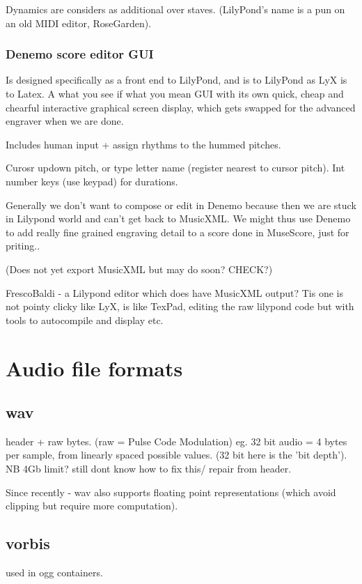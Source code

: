 \documentclass[oneside,english]{scrbook}
\begin{document}
Dynamics are considers as additional over staves.  (LilyPond's name is a pun on an old MIDI editor, RoseGarden).

\subsection{Denemo score editor GUI}
Is designed specifically as a front end to LilyPond, and is to LilyPond as LyX is to Latex.  A what you see if what you mean GUI with its own quick, cheap and chearful interactive graphical screen display, which gets swapped for the advanced engraver when we are done.

Includes human input + assign rhythms to the hummed pitches.

Curosr updown pitch, or type letter name (register nearest to cursor pitch).  Int number keys (use keypad) for durations.

Generally we don't want to compose or edit in Denemo because then we are stuck in Lilypond world and can't get back to MusicXML.  We might thus use Denemo to add really fine grained engraving detail to a score done in MuseScore, just for priting..

(Does not yet export MusicXML but may do soon? CHECK?)

FrescoBaldi - a Lilypond editor which does have MusicXML output? Tis one is not pointy clicky like LyX, is like TexPad, editing the raw lilypond code but with tools to autocompile and display etc.


\chapter{Audio file formats}

\section{wav}

header + raw bytes. (raw = Pulse Code Modulation) eg. 32 bit audio = 4 bytes per sample, from linearly spaced possible values. (32 bit here is the 'bit depth').
NB 4Gb limit? still dont know how to fix this/ repair from header.

Since recently - wav also supports floating point representations (which avoid clipping but require more computation).

\section{vorbis}
used in ogg containers.
\end{document}
